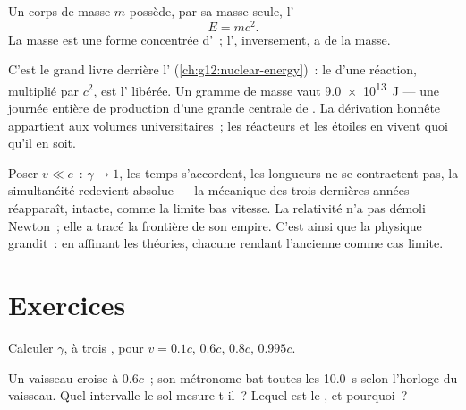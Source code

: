 \begin{theorem}\label{thm:g12:special-relativity:emc2}
Un corps de masse $m$ possède, par sa masse seule,
l'
\[ E = m c^2 . \]
La masse est une forme concentrée d'~;
l', inversement, a de la masse.
\end{theorem}
\admitted

\begin{remark}\label{rem:g12:special-relativity:emc2seen}
C'est le grand livre derrière l'
(\cref{ch:g12:nuclear-energy})~: le 
d'une réaction, multiplié par $c^2$, est l'
libérée. Un gramme de masse vaut \qty{9.0e13}{J} --- une journée
entière de production d'une grande centrale de
. La dérivation honnête appartient aux
volumes universitaires~; les réacteurs et les étoiles en vivent
quoi qu'il en soit.
\end{remark}

\begin{remark}\label{rem:g12:special-relativity:newton}
Poser $v \ll c$~: $\gamma \to 1$, les temps s'accordent, les longueurs
ne se contractent pas, la simultanéité redevient absolue --- la
mécanique des trois dernières années réapparaît, intacte, comme la
limite bas vitesse. La relativité n'a pas démoli Newton~; elle a
tracé la frontière de son empire. C'est ainsi que la physique
grandit~: en affinant les théories, chacune rendant l'ancienne comme
cas limite.
\end{remark}

\section{Exercices}

\begin{exercise}[$\star$]\label{exo:g12:special-relativity:1}
Calculer $\gamma$, à trois
, pour $v = 0.1c$,
$0.6c$, $0.8c$, $0.995c$.
\end{exercise}

\begin{exercise}[$\star$]\label{exo:g12:special-relativity:2}
Un vaisseau croise à $0.6c$~; son métronome bat toutes les
\qty{10.0}{s} selon l'horloge du vaisseau. Quel intervalle le sol
mesure-t-il~? Lequel est le , et
pourquoi~?
\end{exercise}

